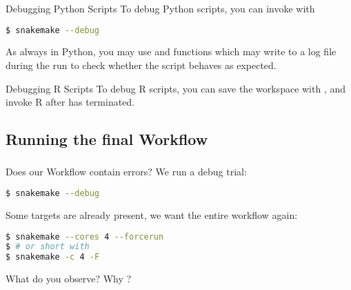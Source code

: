 \begin{frame}[fragile]
	\frametitle{}
	\begin{exampleblock}{Debugging Python Scripts}
		To debug Python scripts, you can invoke \Snakemake{} with
		\begin{lstlisting}[language=Bash, style=Shell]
$ snakemake --debug
		\end{lstlisting}
		As always in Python, you may use  and  functions which may write to a log file during the run to check whether the script behaves as expected.
	\end{exampleblock}
	\pause
	\begin{exampleblock}{Debugging R Scripts}
		To debug R scripts, you can save the workspace with , and invoke R after \Snakemake{} has terminated. 
	\end{exampleblock}
\end{frame}

\subsection{Running the final Workflow}

\begin{frame}[fragile]
	\frametitle{}
	\begin{task}
		Does our Workflow contain errors? We run a debug trial:
		\begin{lstlisting}[language=Bash, style=Shell]
$ snakemake --debug
		\end{lstlisting}
	\end{task}
	\pause
	Some targets are already present, we want the entire workflow again:
	\begin{lstlisting}[language=Bash, style=Shell]
$ snakemake --cores 4 --forcerun
$ # or short with
$ snakemake -c 4 -F
	\end{lstlisting}
     
	\begin{question}
		What do you observe? Why ?
	\end{question}
\end{frame}

